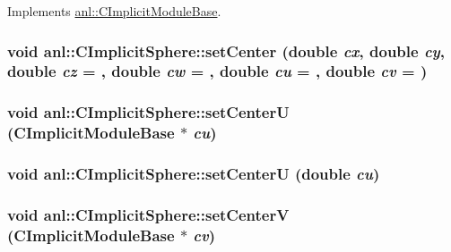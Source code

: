Implements \hyperlink{classanl_1_1CImplicitModuleBase_ab88f8a1822dcfbc13ba5230318b0acd1}{anl::CImplicitModuleBase}.\hypertarget{classanl_1_1CImplicitSphere_a2b3dfb1813078c5b898510459610038c}{
\subsubsection[{setCenter}]{\setlength{\rightskip}{0pt plus 5cm}void anl::CImplicitSphere::setCenter (double {\em cx}, \/  double {\em cy}, \/  double {\em cz} = {}, \/  double {\em cw} = {}, \/  double {\em cu} = {}, \/  double {\em cv} = {})}}
\label{classanl_1_1CImplicitSphere_a2b3dfb1813078c5b898510459610038c}
\hypertarget{classanl_1_1CImplicitSphere_a22660d1fb812609ae063a78a45757f46}{
\subsubsection[{setCenterU}]{\setlength{\rightskip}{0pt plus 5cm}void anl::CImplicitSphere::setCenterU ({\bf CImplicitModuleBase} $\ast$ {\em cu})}}
\label{classanl_1_1CImplicitSphere_a22660d1fb812609ae063a78a45757f46}
\hypertarget{classanl_1_1CImplicitSphere_a2cb21e86ad213bb88e5350b9ec9d89de}{
\subsubsection[{setCenterU}]{\setlength{\rightskip}{0pt plus 5cm}void anl::CImplicitSphere::setCenterU (double {\em cu})}}
\label{classanl_1_1CImplicitSphere_a2cb21e86ad213bb88e5350b9ec9d89de}
\hypertarget{classanl_1_1CImplicitSphere_abb950023259379f1384f14510e494631}{
\subsubsection[{setCenterV}]{\setlength{\rightskip}{0pt plus 5cm}void anl::CImplicitSphere::setCenterV ({\bf CImplicitModuleBase} $\ast$ {\em cv})}}
\label{classanl_1_1CImplicitSphere_abb950023259379f1384f14510e494631}
